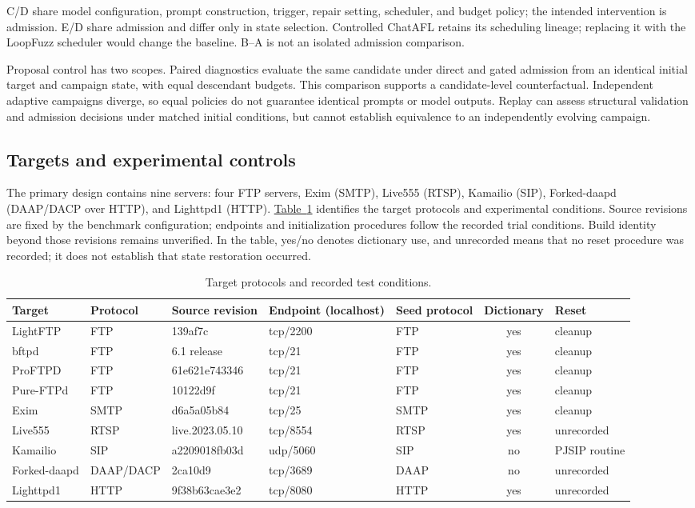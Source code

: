 \documentclass[final,5p,times,number]{elsarticle}
\newcommand{\namedref}[2]{\hyperref[#2]{#1~\ref*{#2}}}
\begin{document}
C/D share model configuration, prompt construction, trigger, repair setting, scheduler, and budget policy; the intended intervention is admission. E/D share admission and differ only in state selection. Controlled ChatAFL retains its scheduling lineage; replacing it with the LoopFuzz scheduler would change the baseline. B--A is not an isolated admission comparison.

Proposal control has two scopes. Paired diagnostics evaluate the same candidate under direct and gated admission from an identical initial target and campaign state, with equal descendant budgets. This comparison supports a candidate-level counterfactual. Independent adaptive campaigns diverge, so equal policies do not guarantee identical prompts or model outputs. Replay can assess structural validation and admission decisions under matched initial conditions, but cannot establish equivalence to an independently evolving campaign.

\subsection{Targets and experimental controls}
The primary design contains nine servers: four FTP servers, Exim (SMTP), Live555 (RTSP), Kamailio (SIP), Forked-daapd (DAAP/DACP over HTTP), and Lighttpd1 (HTTP). \namedref{Table}{tab:targets} identifies the target protocols and experimental conditions. Source revisions are fixed by the benchmark configuration; endpoints and initialization procedures follow the recorded trial conditions. Build identity beyond those revisions remains unverified. In the table, yes/no denotes dictionary use, and unrecorded means that no reset procedure was recorded; it does not establish that state restoration occurred.

\begin{table}[!tbp]
\centering\small
\caption{Target protocols and recorded test conditions.}
\label{tab:targets}
\begin{tabular*}{\textwidth}{@{\extracolsep{\fill}}lllllcl@{}}
\toprule
Target & Protocol & Source revision & Endpoint (localhost) & Seed protocol & Dictionary & Reset \\
\midrule
LightFTP & FTP & 139af7c & tcp/2200 & FTP & yes & cleanup \\
bftpd & FTP & 6.1 release & tcp/21 & FTP & yes & cleanup \\
ProFTPD & FTP & 61e621e743346 & tcp/21 & FTP & yes & cleanup \\
Pure-FTPd & FTP & 10122d9f & tcp/21 & FTP & yes & cleanup \\
Exim & SMTP & d6a5a05b84 & tcp/25 & SMTP & yes & cleanup \\
Live555 & RTSP & live.2023.05.10 & tcp/8554 & RTSP & yes & unrecorded \\
Kamailio & SIP & a2209018fb03d & udp/5060 & SIP & no & PJSIP routine \\
Forked-daapd & DAAP/DACP & 2ca10d9 & tcp/3689 & DAAP & no & unrecorded \\
Lighttpd1 & HTTP & 9f38b63cae3e2 & tcp/8080 & HTTP & yes & unrecorded \\
\bottomrule
\end{tabular*}
\end{table}
\end{document}
